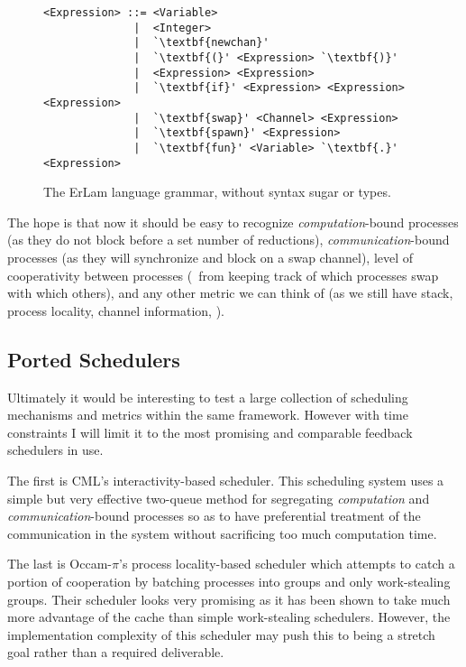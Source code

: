 \begin{figure} %
\centering
\begin{BVerbatim}[commandchars=\\\{\}]
<Expression> ::= <Variable> 
              |  <Integer>
              |  `\textbf{newchan}'
              |  `\textbf{(}' <Expression> `\textbf{)}'
              |  <Expression> <Expression>
              |  `\textbf{if}' <Expression> <Expression> <Expression>
              |  `\textbf{swap}' <Channel> <Expression>
              |  `\textbf{spawn}' <Expression>
              |  `\textbf{fun}' <Variable> `\textbf{.}' <Expression>
\end{BVerbatim}
\caption{The ErLam language grammar, without syntax sugar or types.}
\label{fig:grammer}
\end{figure}

The hope is that now it should be easy to recognize {\em computation}-bound processes (as they do not block
before a set number of reductions), {\em communication}-bound processes (as they will synchronize and block
on a swap channel), level of cooperativity between processes (\ie~from keeping track of which processes swap with
which others), and any other metric we can think of (as we still have stack, process locality, channel
information, \etc).


\subsection{Ported Schedulers}
\label{sec:schedwork}

Ultimately it would be interesting to test a large collection of scheduling mechanisms and metrics within the same 
framework. However with time constraints I will limit it to the most promising and comparable feedback schedulers
in use.

The first is CML's interactivity-based scheduler. 
This scheduling system uses a simple but very effective two-queue method for segregating {\em computation} and 
{\em communication}-bound processes so as to have preferential treatment of the communication in the system without
sacrificing too much computation time.

The last is Occam-$\pi$'s process locality-based scheduler which attempts to catch a portion of cooperation by
batching processes into groups and only work-stealing groups. Their scheduler looks very promising as it has 
been shown to take much more advantage of the cache than simple work-stealing schedulers. However, the implementation
complexity of this scheduler may push this to being a stretch goal rather than a required deliverable.

